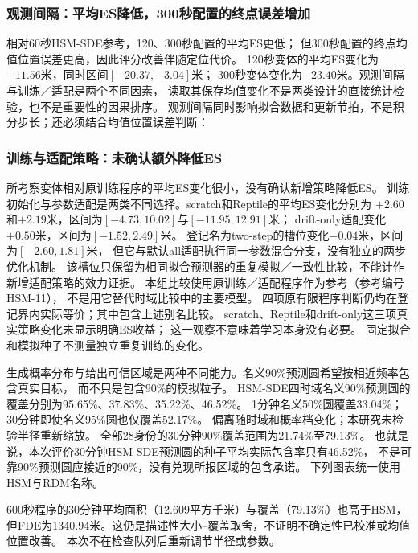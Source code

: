 \subsubsection{观测间隔：平均ES降低，300秒配置的终点误差增加}
相对60秒HSM-SDE参考，120、300秒配置的平均ES更低；
但300秒配置的终点均值位置误差更高，因此评分改善伴随定位代价。
120秒变体的平均ES变化为$-11.56$米，同时区间$[-20.37,-3.04]$米；
300秒变体变化为$-23.40$米。观测间隔与训练／适配是两个不同因素，
读取其保存均值变化不是两类设计的直接统计检验，也不是重要性的因果排序。
观测间隔同时影响拟合数据和更新节拍，不是积分步长；还必须结合均值位置误差判断：
\begingroup\renewcommand{\subsection}[1]{}

\endgroup

\subsubsection{训练与适配策略：未确认额外降低ES}
所考察变体相对原训练程序的平均ES变化很小，没有确认新增策略降低ES。
训练初始化与参数适配是两类不同选择。scratch和Reptile的平均ES变化分别为
$+2.60$和$+2.19$米，区间为$[-4.73,10.02]$与$[-11.95,12.91]$米；
drift-only适配变化$+0.50$米，区间为$[-1.52,2.49]$米。
登记名为two-step的槽位变化$-0.04$米，区间为$[-2.60,1.81]$米，
但它与默认all适配执行同一参数混合分支，没有独立的两步优化机制。
该槽位只保留为相同拟合预测器的重复模拟／一致性比较，不能计作新增适配策略的效力证据。
本组比较使用原训练／适配程序作为参考（参考编号HSM-11），
不是用它替代时域比较中的主要模型。
四项原有限程序判断仍均在登记界内实际等价；其中包含上述别名比较。
scratch、Reptile和drift-only这三项真实策略变化未显示明确ES收益；
这一观察不意味着学习本身没有必要。
固定拟合和模拟种子不测量独立重复训练的变化。

\subsection{长时域预测圆尚不具有经验可靠性}\label{sec:region-reliability}
生成概率分布与给出可信区域是两种不同能力。名义90\%预测圆希望按相近频率包含真实目标，
而不只是包含90\%的模拟粒子。
HSM-SDE四时域名义90\%预测圆的覆盖分别为95.65\%、37.83\%、35.22\%、46.52\%。
1分钟名义50\%圆覆盖33.04\%；30分钟即使名义95\%圆也仅覆盖52.17\%。
偏离随时域和概率档变化；本研究未检验半径重新缩放。
全部28身份的30分钟90\%覆盖范围为21.74\%至79.13\%。
也就是说，本次评价30分钟HSM-SDE预测圆的种子平均实际包含率只有46.52\%，
不是可靠90\%预测圆应接近的90\%，没有兑现所报区域的包含承诺。
下列图表统一使用HSM与RDM名称。

600秒程序的30分钟平均面积（12.609平方千米）与覆盖（79.13\%）也高于HSM，
但FDE为1340.94米。这仍是描述性大小--覆盖取舍，不证明不确定性已校准或均值位置改善。
本次不在检查队列后重新调节半径或参数。

